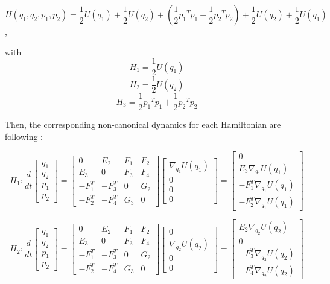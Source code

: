 \documentclass{article}
\begin{document}
$$\displaystyle H(q_1, q_2, p_1, p_2) = \frac{1}{2}U(q_1) + \frac{1}{2}U(q_2)+(\frac{1}{2}{p_1}^T p_1 + \frac{1}{2}{p_2}^T p_2 )+ \frac{1}{2}U(q_2) + \frac{1}{2}U(q_1) $$, 

with $$\displaystyle H_1 = \frac{1}{2}U(q_1)$$ $$\displaystyle H_2 = \frac{1}{2}U(q_2)$$ $$\displaystyle H_3 = \frac{1}{2}{p_1}^T p_1 + \frac{1}{2}{p_2}^T p_2 $$

Then, the corresponding non-canonical dynamics for each Hamiltonian are following :

\[
H_1 : \frac{d}{dt}
\left[
\begin{array}{ccc}
q_1 \\
q_2 \\
p_1 \\
p_2 
\end{array}
\right]
=
\left[
\begin{array}{cclcc}
0 & E_{2} & F_{1} & F_{2} \\
E_3 & 0& F_3 & F_4 \\
-F_1^T & -F_3^T & 0 & G_2 \\
-F_2^T & -F_4^T & G_3 & 0 
\end{array}
\right]
\left[
\begin{array}{ccc}
\nabla_{q_1} U(q_1) \\
0 \\
0 \\
0 
\end{array}
\right]
=
\left[
\begin{array}{ccc}
0 \\
E_3 \nabla_{q_1} U(q_1) \\
-F_1^T \nabla_{q_1} U(q_1) \\
-F_2^T \nabla_{q_1} U(q_1) 
\end{array}
\right]
\] 

\[
H_2 : \frac{d}{dt}
\left[
\begin{array}{ccc}
q_1 \\
q_2 \\
p_1 \\
p_2 
\end{array}
\right]
=
\left[
\begin{array}{cclcc}
0 & E_{2} & F_{1} & F_{2} \\
E_3 & 0& F_3 & F_4 \\
-F_1^T & -F_3^T & 0 & G_2 \\
-F_2^T & -F_4^T & G_3 & 0 
\end{array}
\right]
\left[
\begin{array}{ccc}
0\\
\nabla_{q_2} U(q_2)  \\
0 \\
0 
\end{array}
\right]
=
\left[
\begin{array}{ccc}
E_2 \nabla_{q_2} U(q_2)  \\
0 \\
-F_3^T\nabla_{q_2} U(q_2) \\
-F_4^T \nabla_{q_2} U(q_2) 
\end{array}
\right]
\] 
\end{document}
